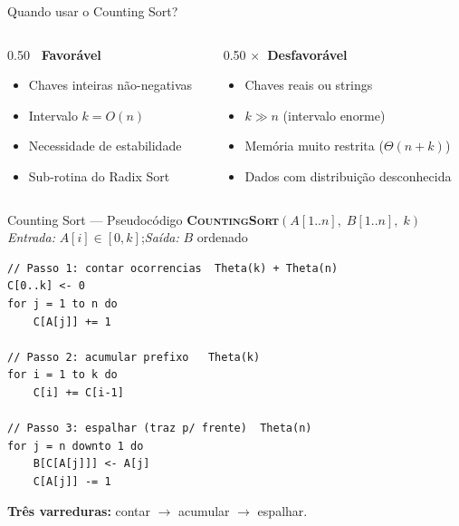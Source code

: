 \documentclass[aspectratio=169]{beamer}
\begin{document}
\begin{frame}{Quando usar o Counting Sort?}
  \begin{columns}[T]
    \begin{column}{0.50\textwidth}
      \textbf{\checkmark\ Favorável}
      \begin{itemize}
        \item Chaves inteiras não-negativas
        \item Intervalo $k = O(n)$
        \item Necessidade de estabilidade
        \item Sub-rotina do Radix Sort
      \end{itemize}
    \end{column}
    \begin{column}{0.50\textwidth}
      \textbf{$\times$\ Desfavorável}
      \begin{itemize}
        \item Chaves reais ou strings
        \item $k \gg n$ (intervalo enorme)
        \item Memória muito restrita ($\Theta(n+k)$)
        \item Dados com distribuição desconhecida
      \end{itemize}
    \end{column}
  \end{columns}
  \vspace{0.5cm}
  \begin{center}
  \end{center}
\end{frame}

\begin{frame}[fragile]{Counting Sort — Pseudocódigo}
  \textbf{\textsc{CountingSort}}$(A[1..n],\; B[1..n],\; k)$\\
  \emph{Entrada:} $A[i]\in[0,k]$;\quad \emph{Saída:} $B$ ordenado
\begin{lstlisting}[basicstyle=\ttfamily\scriptsize]
// Passo 1: contar ocorrencias  Theta(k) + Theta(n)
C[0..k] <- 0
for j = 1 to n do
    C[A[j]] += 1

// Passo 2: acumular prefixo   Theta(k)
for i = 1 to k do
    C[i] += C[i-1]

// Passo 3: espalhar (traz p/ frente)  Theta(n)
for j = n downto 1 do
    B[C[A[j]]] <- A[j]
    C[A[j]] -= 1
\end{lstlisting}
  \textbf{Três varreduras:} contar $\to$ acumular $\to$ espalhar.
\end{frame}
\end{document}
